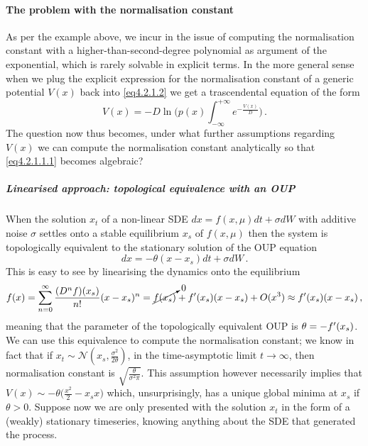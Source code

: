 \documentclass[../main.tex]{subfiles}
\begin{document}
\paragraph{The problem with the normalisation constant}\label{par4.2.1.1}
As per the example above, we incur in the issue of computing the normalisation constant with a higher-than-second-degree polynomial as argument of the exponential, which is rarely solvable in explicit terms. 
In the more general sense when we plug the explicit expression for the normalisation constant of a generic potential $V(x)$ back into \eqref{eq4.2.1.2} we get a trascendental equation of the form
\begin{equation}\label{eq4.2.1.1.1}
     V(x) = -D\ln\bigg(p(x)\int_{-\infty}^{+\infty}e^{-\frac{V(x)}{D}}\bigg)\,.
\end{equation}
The question now thus becomes, under what further assumptions regarding $V(x)$ we can compute the normalisation constant analytically so that \eqref{eq4.2.1.1.1} becomes algebraic?
\subparagraph{Linearised approach: topological equivalence with an OUP}
When the solution $x_{t}$ of a non-linear SDE $dx = f(x,\mu)dt + \sigma dW$ with additive noise $\sigma$ settles onto a stable equilibrium $x_{s}$ of $f(x,\mu)$ then the system is topologically equivalent to the stationary solution of the OUP equation
\begin{equation*}
    dx = -\theta(x-x_{s})dt + \sigma dW \,.
\end{equation*}
This is easy to see by linearising the dynamics onto the equilibrium
\begin{equation*}
        f(x) = \sum_{n=0}^{\infty}\frac{(D^{n}f)(x_{s})}{n!}(x-x_{s})^{n} = \cancelto{0}{f(x_{s})} + f'(x_{s})(x-x_{s}) + O(x^{3}) \approx f'(x_{s})(x-x_{s})\,,
\end{equation*}
meaning that the parameter of the topologically equivalent OUP is $\theta = -f'(x_{s})$.
We can use this equivalence to compute the normalisation constant; we know in fact \cite[Theorem 3.2, pp. 4-6]{StocProc} that if $x_{t}\sim \mathcal{N}(x_{s},\frac{\sigma^{2}}{2\theta})$, in the time-asymptotic limit $t\to\infty$, then normalisation constant is $\sqrt{\frac{\theta}{\sigma^{2}\pi}}$.
This assumption however necessarily implies that $V(x)\sim -\theta\big(\frac{x^{2}}{2} - x_{s}x\big)$ which, unsurprisingly, has a unique global minima at $x_{s}$ if $\theta>0$.
Suppose now we are only presented with the solution $x_{t}$ in the form of a (weakly) stationary timeseries, knowing anything about the SDE that generated the process.
\end{document}
